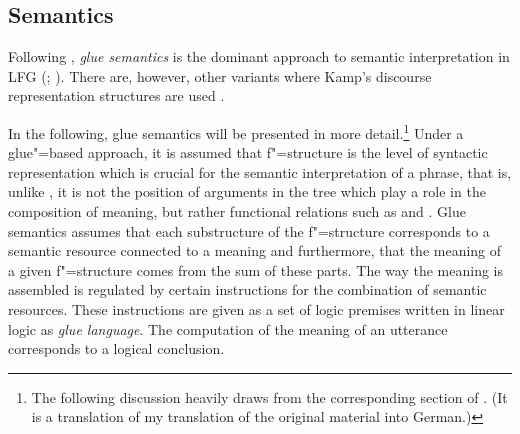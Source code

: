\ea
{}
\z

\ea
{}
\hspace*{4em}
\z
{}

\subsection{Semantics}
\label{lfg-semantics}
\label{glue-semantics}

Following \citet[--92]{Dalrymple2006a}, \emph{glue semantics} is the dominant approach to semantic interpretation in LFG
(\citealp*{DLS93a-u}; \citealp[Chapter~8]{Dalrymple2001a-u}). There are, however, other variants
where Kamp's discourse representation structures \citep{KR93a} are used \citep{FR83b,FR83a}.

In the following, glue semantics will be presented in more detail.\footnote{
The following discussion heavily draws from the corresponding section of . (It
is a translation of my translation of the original material into German.)
}
Under a glue"=based approach, it is assumed that f"=structure is the level of syntactic representation which is crucial for the semantic interpretation of
a phrase, that is, unlike \gbt, it is not the position of arguments in the tree which play a role in the composition of meaning, but rather functional relations such as 
\lfgsubj and \lfgobj. Glue semantics assumes that each substructure of the f"=structure corresponds to a semantic resource connected to a meaning and furthermore, that the meaning
of a given f"=structure comes from the sum of these parts. The way the meaning is assembled is
regulated by certain instructions for the combination of semantic resources. These instructions are given
as a set of logic premises written in linear logic as \emph{glue language}. The computation of the meaning of an utterance corresponds to a logical conclusion.

